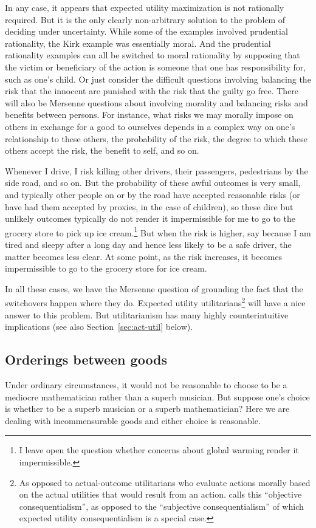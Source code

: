 In any case, it appears that expected utility maximization is not rationally required. But it is the only clearly non-arbitrary solution
to the problem of deciding under uncertainty. While some of the examples involved prudential rationality, the Kirk example
was essentially moral. And the prudential rationality examples can all be switched to moral rationality by supposing
that the victim or beneficiary of the action is someone that one has responsibility for, such as one's child.
Or just consider the difficult questions involving balancing the risk that the innocent are punished with 
the risk that the guilty go free.
There will also be Mersenne questions about involving morality and balancing risks and benefits between persons.
For instance, what risks we may morally impose on others in exchange for a good to ourselves depends in a complex way 
on one's relationship to these others, the probability of the risk, the degree to which these others accept the risk, the 
benefit to self, and so on. 

Whenever I drive, I risk killing other drivers, their passengers, pedestrians by the side road, and so on.
But the probability of these awful outcomes is very small, and typically other people on or by the road have accepted reasonable
risks (or have had them accepted by proxies, in the case of children), so these dire but unlikely outcomes typically do not render it impermissible for
me to go to the grocery store to pick up ice cream.\footnote{I leave open the question whether concerns about global warming 
render it impermissible.} But when the risk is higher, say because I am tired and sleepy after a long day and hence less likely to be
a safe driver, the matter becomes less clear. At some point, as the risk increases, it becomes impermissible to go to the grocery
store for ice cream. 

In all these cases, we have the Mersenne question of grounding the fact that the switchovers happen where they do.
Expected utility utilitarians\footnote{As opposed to actual-outcome utilitarians who evaluate actions morally based on the
actual utilities that would result from an action.  calls this ``objective
consequentialism'', as opposed to the ``subjective consequentialism'' of which expected utility consequentialism is
a special case.} will have a nice answer to this problem. But utilitarianism has many highly counterintuitive 
implications (see also Section~\ref{sec:act-util} below).

\subsection{Orderings between goods}
Under ordinary circumstances, it would not be reasonable to choose to be a mediocre mathematician rather than a superb musician. 
But suppose one's choice is whether to be a superb
musician or a superb mathematician? Here we are dealing with incommensurable goods and either choice is reasonable.

